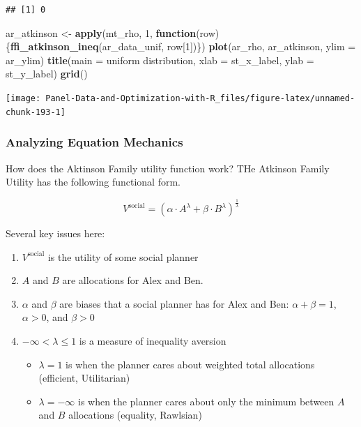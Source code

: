 \documentclass[
]{book}
\newenvironment{Shaded}{\begin{snugshade}}{\end{snugshade}}
\newcommand{\ControlFlowTok}[1]{\textcolor[rgb]{0.13,0.29,0.53}{\textbf{#1}}}
\newcommand{\DataTypeTok}[1]{\textcolor[rgb]{0.13,0.29,0.53}{#1}}
\newcommand{\DecValTok}[1]{\textcolor[rgb]{0.00,0.00,0.81}{#1}}
\newcommand{\KeywordTok}[1]{\textcolor[rgb]{0.13,0.29,0.53}{\textbf{#1}}}
\newcommand{\NormalTok}[1]{#1}
\newcommand{\StringTok}[1]{\textcolor[rgb]{0.31,0.60,0.02}{#1}}
\providecommand{\tightlist}{%
  \setlength{\itemsep}{0pt}\setlength{\parskip}{0pt}}
\begin{document}
\begin{verbatim}
## [1] 0
\end{verbatim}

\begin{Shaded}
\begin{Highlighting}[]
\NormalTok{ar\_atkinson \textless{}{-}}\StringTok{ }\KeywordTok{apply}\NormalTok{(mt\_rho, }\DecValTok{1}\NormalTok{, }\ControlFlowTok{function}\NormalTok{(row)\{}\KeywordTok{ffi\_atkinson\_ineq}\NormalTok{(ar\_data\_unif, row[}\DecValTok{1}\NormalTok{])\})}
\KeywordTok{plot}\NormalTok{(ar\_rho, ar\_atkinson, }\DataTypeTok{ylim =}\NormalTok{ ar\_ylim)}
\KeywordTok{title}\NormalTok{(}\DataTypeTok{main =} \StringTok{\textquotesingle{}uniform distribution\textquotesingle{}}\NormalTok{, }\DataTypeTok{xlab =}\NormalTok{ st\_x\_label, }\DataTypeTok{ylab =}\NormalTok{ st\_y\_label)}
\KeywordTok{grid}\NormalTok{()}
\end{Highlighting}
\end{Shaded}

\begin{center}\texttt{[image: Panel-Data-and-Optimization-with-R\_files/figure-latex/unnamed-chunk-193-1]} \end{center}

\hypertarget{analyzing-equation-mechanics}{%
\subsubsection{Analyzing Equation Mechanics}\label{analyzing-equation-mechanics}}

How does the Aktinson Family utility function work? THe Atkinson Family Utility has the following functional form.

\[
V^{\text{social}}
=
\left(
\alpha
\cdot
A^{\lambda}
+
\beta
\cdot
B^{\lambda}
\right)^{\frac{1}{\lambda}}
\]

Several key issues here:

\begin{enumerate}
\def\labelenumi{\arabic{enumi}.}
\tightlist
\item
  \(V^{\text{social}}\) is the utility of some social planner
\item
  \(A\) and \(B\) are allocations for Alex and Ben.
\item
  \(\alpha\) and \(\beta\) are biases that a social planner has for Alex and Ben: \(\alpha+\beta=1\), \(\alpha>0\), and \(\beta>0\)
\item
  \(-\infty < \lambda \le 1\) is a measure of inequality aversion

  \begin{itemize}
  \tightlist
  \item
    \(\lambda=1\) is when the planner cares about weighted total allocations (efficient, Utilitarian)
  \item
    \(\lambda=-\infty\) is when the planner cares about only the minimum between \(A\) and \(B\) allocations (equality, Rawlsian)
  \end{itemize}
\end{enumerate}
\end{document}

